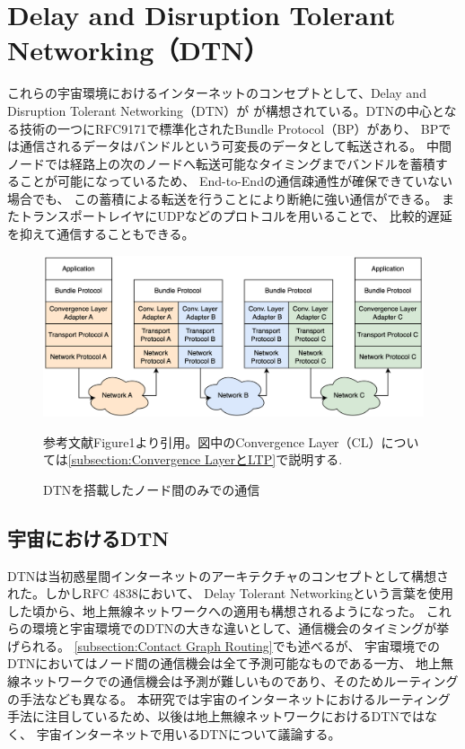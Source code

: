 \section{Delay and Disruption Tolerant Networking（DTN）}
これらの宇宙環境におけるインターネットのコンセプトとして、Delay and Disruption Tolerant Networking（DTN）が
が構想されている。DTNの中心となる技術の一つにRFC9171\cite{rfc9171}で標準化されたBundle Protocol（BP）があり、 
BPでは通信されるデータはバンドルという可変長のデータとして転送される。 
中間ノードでは経路上の次のノードへ転送可能なタイミングまでバンドルを蓄積することが可能になっているため、 
End-to-Endの通信疎通性が確保できていない場合でも、 この蓄積による転送を行うことにより断絶に強い通信ができる。
またトランスポートレイヤにUDPなどのプロトコルを用いることで、 比較的遅延を抑えて通信することもできる。\cite{bundle_protocol_architecture}

\begin{figure}[tbh]
    \centering
    \includegraphics[width=0.7\textheight]{img/dtnprotocolstack.pdf}
    \caption{DTNを搭載したノード間のみでの通信}
    \label{fig:dtnprotocolstack}
    \begin{minipage}{\textwidth}
        \raggedright
        参考文献\cite{bundle_protocol_architecture}Figure1より引用。図中のConvergence Layer（CL）については\ref{subsection:Convergence LayerとLTP}で説明する.
    \end{minipage}
\end{figure}

\subsection{宇宙におけるDTN}
DTNは当初惑星間インターネットのアーキテクチャのコンセプトとして構想された。しかしRFC 4838\cite{rfc4838}において、
Delay Tolerant Networkingという言葉を使用した頃から、地上無線ネットワークへの適用も構想されるようになった。
これらの環境と宇宙環境でのDTNの大きな違いとして、通信機会のタイミングが挙げられる。
\ref{subsection:Contact Graph Routing}でも述べるが、
宇宙環境でのDTNにおいてはノード間の通信機会は全て予測可能なものである一方、
地上無線ネットワークでの通信機会は予測が難しいものであり、そのためルーティングの手法なども異なる。
本研究では宇宙のインターネットにおけるルーティング手法に注目しているため、以後は地上無線ネットワークにおけるDTNではなく、
宇宙インターネットで用いるDTNについて議論する。

